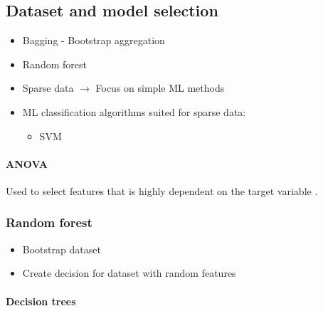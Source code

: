 \subsection{Dataset and model selection}
\begin{itemize}
    \item Bagging - Bootstrap aggregation
    \item Random forest
\end{itemize}

\begin{itemize}
    \item Sparse data $ \rightarrow $ Focus on simple ML methods
    \item ML classification algorithms suited for sparse data: 
        \begin{itemize}
            \item SVM
        \end{itemize}
        
\end{itemize}



\paragraph{ANOVA} 
Used to select features that is highly dependent on the target variable
\cite{anova}. 



\subsubsection{Random forest}
\begin{itemize}
    \item Bootstrap dataset
    \item Create decision for dataset with random features 
\end{itemize}

\paragraph{Decision trees} 







